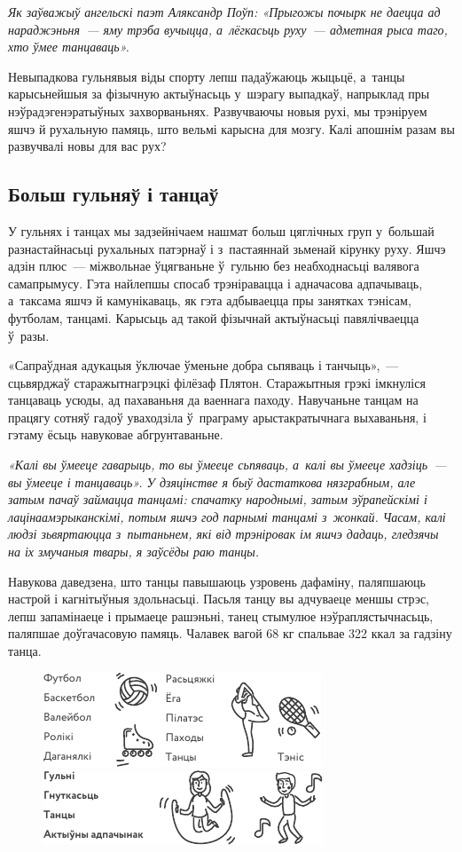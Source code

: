 \emph{Як заўважыў ангельскі паэт Аляксандр Поўп: «Прыгожы почырк не даецца ад нараджэньня~--- яму трэба вучыцца, а~лёгкасьць руху~--- адметная рыса таго, хто ўмее танцаваць».}

Невыпадкова гульнявыя віды спорту лепш падаўжаюць жыцьцё, а~танцы карысьнейшыя за фізычную актыўнасьць у~шэрагу выпадкаў, напрыклад пры нэўрадэгенэратыўных захворваньнях. Развучваючы новыя рухі, мы трэніруем яшчэ й рухальную памяць, што вельмі карысна для мозгу. Калі апошнім разам вы развучвалі новы для вас рух?

\subsection*{Больш гульняў і танцаў}

У гульнях і танцах мы задзейнічаем нашмат больш цяглічных груп у~большай разнастайнасьці рухальных патэрнаў і з~пастаяннай зьменай кірунку руху. Яшчэ адзін плюс~--- міжвольнае ўцягваньне ў~гульню без неабходнасьці валявога самапрымусу. Гэта найлепшы спосаб трэніравацца і адначасова адпачываць, а~таксама яшчэ й камунікаваць, як гэта адбываецца пры занятках тэнісам, футболам, танцамі. Карысьць ад такой фізычнай актыўнасьці павялічваецца ў~разы.

«Сапраўдная адукацыя ўключае ўменьне добра сьпяваць і танчыць»,~--- сцьвярджаў старажытнагрэцкі філёзаф Плятон. Старажытныя грэкі імкнуліся танцаваць усюды, ад пахаваньня да ваеннага паходу. Навучаньне танцам на працягу сотняў гадоў уваходзіла ў~праграму арыстакратычнага выхаваньня, і гэтаму ёсьць навуковае абгрунтаваньне.

\emph{«Калі вы ўмееце гаварыць, то вы ўмееце сьпяваць, а~калі вы ўмееце хадзіць~--- вы ўмееце і танцаваць». У дзяцінстве я быў дастаткова нязграбным, але затым пачаў займацца танцамі: спачатку народнымі, затым эўрапейскімі і лацінаамэрыканскімі, потым яшчэ год парнымі танцамі з~жонкай. Часам, калі людзі зьвяртаюцца з~пытаньнем, які від трэніровак ім яшчэ дадаць, гледзячы на іх змучаныя твары, я заўсёды раю танцы.}

Навукова даведзена, што танцы павышаюць узровень дафаміну, паляпшаюць настрой і кагнітыўныя здольнасьці. Пасьля танцу вы адчуваеце меншы стрэс, лепш запамінаеце і прымаеце рашэньні, танец стымулюе нэўраплястычнасьць, паляпшае доўгачасовую памяць. Чалавек вагой 68 кг спальвае 322 ккал за гадзіну танца.

\begin{figure}[htb!]
  \centering
  \includegraphics[scale=1.5]{willpower/ch5/11.pdf}\\
  \medskip
  \includegraphics[scale=1.5]{willpower/ch5/12.pdf}
\end{figure}

